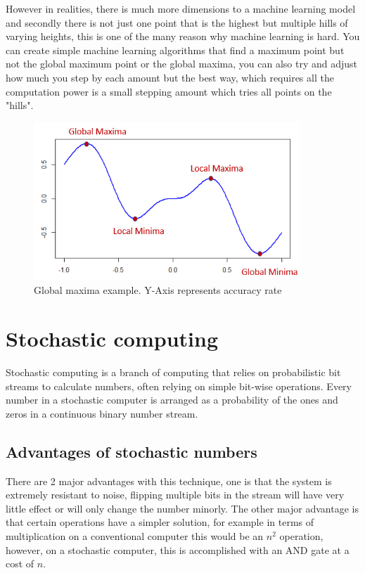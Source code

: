 \documentclass[a4paper,twoside,phd]{BYUPhys}
\begin{document}
However in realities, there is much more dimensions to a machine learning model and secondly there is not just one point that is the highest but multiple hills of varying heights, this is one of the many reason why machine learning is hard. You can create simple machine learning algorithms that find a maximum point but not the global maximum point or the global maxima, you can also try and adjust how much you step by each amount but the best way, which requires all the computation power is a small stepping amount which tries all points on the "hills". 
\begin{figure}[H]
\centering
\includegraphics[width=10cm]{pictures/global_minima.png}
\caption{Global maxima example.
Y-Axis represents accuracy rate}
\label{fig:global_minima}
\end{figure}

\section{Stochastic computing}
Stochastic computing is a branch of computing that relies on probabilistic bit streams to calculate numbers, often relying on simple bit-wise operations. Every number in a stochastic computer is arranged as a probability of the ones and zeros in a continuous binary number stream. 

\subsection{Advantages of stochastic numbers}
There are 2 major advantages with this technique, one is that the system is extremely resistant to noise, flipping multiple bits in the stream will have very little effect or will only change the number minorly. The other major advantage is that certain operations have a simpler solution, for example in terms of multiplication on a conventional computer this would be an $n^2$ operation, however, on a stochastic computer, this is accomplished with an AND gate at a cost of $n$.
\end{document}
